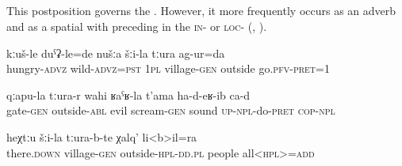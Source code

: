 
\subsection{ }
\label{ssec:postposition tura}

This postposition governs the  . However, it more frequently occurs as an adverb and as a spatial  with preceding  in the \textsc{in}- or \textsc{loc}- (, ).
%
\begin{exe}
	\ex
	\begin{xlist}
		\ex	\label{Hungry and wild, we went out of the village}
		\gll	kːuš-le	duˁʡ-le=de	nušːa	šːi-la	tːura	ag-ur=da  \\
			hungry-\textsc{advz}	wild-\textsc{advz}=\textsc{pst}	\textsc{1pl}	village-\textsc{gen}	outside	go.\textsc{pfv}-\textsc{pret}=1\\
		\glt	{}

		\ex	\label{From outside the gates an evil scream was made}
		\gll	qːapu-la	tːura-r	wahi	ʁaˁʁ-la	t'ama	ha-d-eʁ-ib ca-d\\
			gate-\textsc{gen}	outside-\textsc{abl}	evil	scream-\textsc{gen}	sound	\textsc{up}-\textsc{npl}-do-\textsc{pret} \textsc{cop-npl}\\
		\glt	{}

		\ex	\label{also all people outside of the villag}
		\gll	heχtːu	šːi-la	tːura-b-te	χalq'	li<b>il=ra\\
			there.\textsc{down}	village-\textsc{gen}	outside-\textsc{hpl}-\textsc{dd.pl} 	people	all<\textsc{hpl}>=\textsc{add}\\
		\glt	{}
	\end{xlist}
\end{exe}

